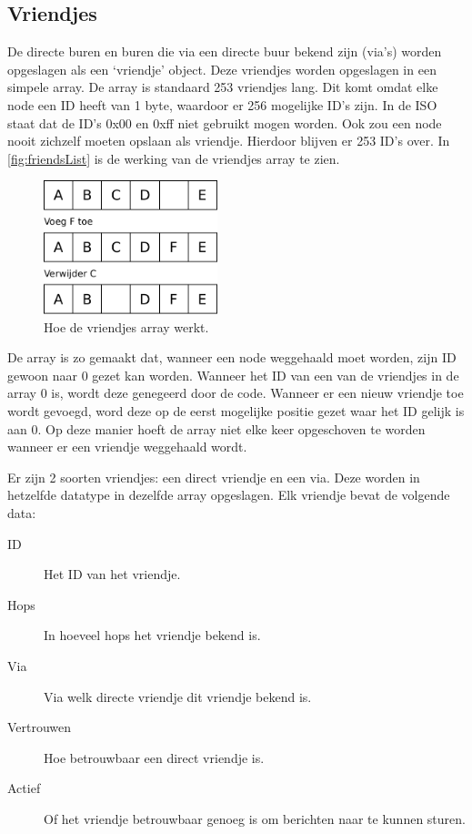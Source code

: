 \subsection{Vriendjes} \label{sec:vriendjes}

De directe buren en buren die via een directe buur bekend zijn (via's) worden opgeslagen als een `vriendje' object. Deze vriendjes worden opgeslagen in een simpele array. De array is standaard 253 vriendjes lang. Dit komt omdat elke node een ID heeft van 1 byte, waardoor er 256 mogelijke ID's zijn. In de ISO staat dat de ID's 0x00 en 0xff niet gebruikt mogen worden. Ook zou een node nooit zichzelf moeten opslaan als vriendje. Hierdoor blijven er 253 ID's over.
In \autoref{fig:friendsList} is de werking van de vriendjes array te zien.


\begin{figure}[ht]
    \centering
    \includegraphics[width=0.45\textwidth]{img/friendList.pdf}
    \caption{Hoe de vriendjes array werkt.}
    \label{fig:friendsList}
\end{figure}

De array is zo gemaakt dat, wanneer een node weggehaald moet worden, zijn ID gewoon naar 0 gezet kan worden. Wanneer het ID van een van de vriendjes in de array 0 is, wordt deze genegeerd door de code. Wanneer er een nieuw vriendje toe wordt gevoegd, word deze op de eerst mogelijke positie gezet waar het ID gelijk is aan 0. Op deze manier hoeft de array niet elke keer opgeschoven te worden wanneer er een vriendje weggehaald wordt.

Er zijn 2 soorten vriendjes: een direct vriendje en een via. Deze worden in hetzelfde datatype in dezelfde array opgeslagen. Elk vriendje bevat de volgende data:
\begin{description}
    \item[ID]       Het ID van het vriendje.
    \item[Hops]     In hoeveel hops het vriendje bekend is.
    \item[Via]      Via welk directe vriendje dit vriendje bekend is.
    \item[Vertrouwen]    Hoe betrouwbaar een direct vriendje is.
    \item[Actief]   Of het vriendje betrouwbaar genoeg is om berichten naar te kunnen sturen.
\end{description}

